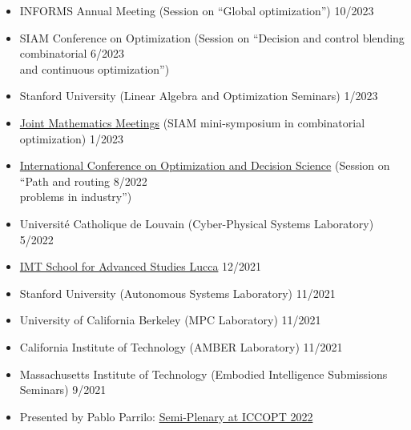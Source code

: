 \documentclass[11pt,a4paper,sans]{moderncv}
\begin{document}
\begin{itemize}

\item
INFORMS Annual Meeting (Session on ``Global optimization'') \hfill 10/2023

\item
SIAM Conference on Optimization (Session on ``Decision and control blending combinatorial \hfill 6/2023 \\ and continuous optimization'')

\item
Stanford University (Linear Algebra and Optimization Seminars) \hfill 1/2023

\item \href{https://www.jointmathematicsmeetings.org/meetings/national/jmm2023/2270_program.html}{\color{cyan}Joint Mathematics Meetings} (SIAM mini-symposium in combinatorial optimization)  \hfill 1/2023


\item \href{http://www.airoconference.it/ods2022/}{\color{cyan}International Conference on Optimization and Decision Science} (Session on ``Path and routing \hfill 8/2022 \\ problems in industry'') 


\item Universit\'e Catholique de Louvain (Cyber-Physical Systems Laboratory) \hfill 5/2022

\item \href{https://www.imtlucca.it/en/eventonew/shortest-paths-graphs-of-convex-sets}{\color{cyan}IMT School for Advanced Studies Lucca} \hfill 12/2021

\item Stanford University (Autonomous Systems Laboratory) \hfill 11/2021

\item University of California Berkeley (MPC Laboratory) \hfill 11/2021

\item California Institute of Technology (AMBER Laboratory) \hfill 11/2021

\item Massachusetts Institute of Technology (Embodied Intelligence Submissions Seminars) \hfill 9/2021

\item
Presented by Pablo Parrilo:
\href{https://iccopt2022.lehigh.edu/scientific-program/semi-plenary-speakers/}{\color{cyan}Semi-Plenary at ICCOPT 2022}

\end{itemize}
\end{document}
